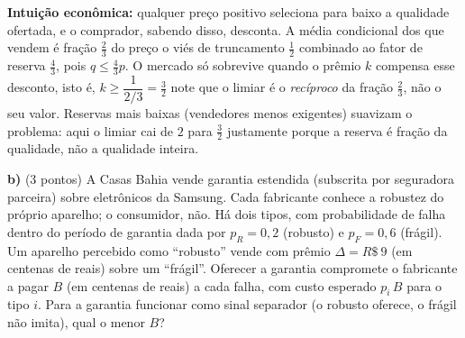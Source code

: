 \begin{solucao}
\textbf{Intui\c{c}\~ao econ\^omica:} qualquer pre\c{c}o positivo seleciona para baixo a qualidade ofertada, e o comprador, sabendo disso, desconta. A m\'edia condicional dos que vendem \'e fra\c{c}\~ao $\tfrac{2}{3}$ do pre\c{c}o \textemdash{} o vi\'es de truncamento $\tfrac{1}{2}$ combinado ao fator de reserva $\tfrac{4}{3}$, pois $q \le \tfrac{4}{3}p$. O mercado s\'o sobrevive quando o pr\^emio $k$ compensa esse desconto, isto \'e, $k \ge \dfrac{1}{2/3} = \tfrac{3}{2}$ \textemdash{} note que o limiar \'e o \emph{rec\'iproco} da fra\c{c}\~ao $\tfrac{2}{3}$, n\~ao o seu valor. Reservas mais baixas (vendedores menos exigentes) suavizam o problema: aqui o limiar cai de $2$ para $\tfrac{3}{2}$ justamente porque a reserva \'e fra\c{c}\~ao da qualidade, n\~ao a qualidade inteira.
\end{solucao}

\textbf{b)} (3 pontos) A Casas Bahia vende garantia estendida (subscrita por seguradora parceira) sobre eletr\^onicos da Samsung. Cada fabricante conhece a robustez do pr\'oprio aparelho; o consumidor, n\~ao. H\'a dois tipos, com probabilidade de falha dentro do per\'iodo de garantia dada por $p_R = 0{,}2$ (robusto) e $p_F = 0{,}6$ (fr\'agil). Um aparelho percebido como ``robusto'' vende com pr\^emio $\Delta = R\$~9$ (em centenas de reais) sobre um ``fr\'agil''. Oferecer a garantia compromete o fabricante a pagar $B$ (em centenas de reais) a cada falha, com custo esperado $p_i\,B$ para o tipo $i$. Para a garantia funcionar como sinal separador (o robusto oferece, o fr\'agil n\~ao imita), qual o menor $B$?

